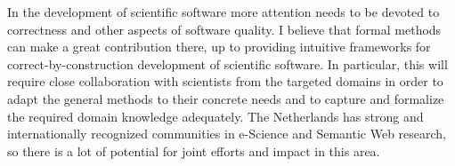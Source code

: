 \documentclass[sigplan,10pt,noacm]{acmart}
\begin{document}
In the development of scientific software more attention needs to be devoted to correctness and other aspects of software quality. I believe that formal methods can make a great contribution there, up to providing intuitive frameworks for correct-by-construction development of scientific software. In particular, this will require close collaboration with scientists from the targeted domains in order to adapt the general methods to their concrete needs and to capture and formalize the required domain knowledge adequately.
The Netherlands has strong and internationally recognized communities in e-Science and Semantic Web research, so there is a lot of potential for joint efforts and impact in this area. 



\end{document}
